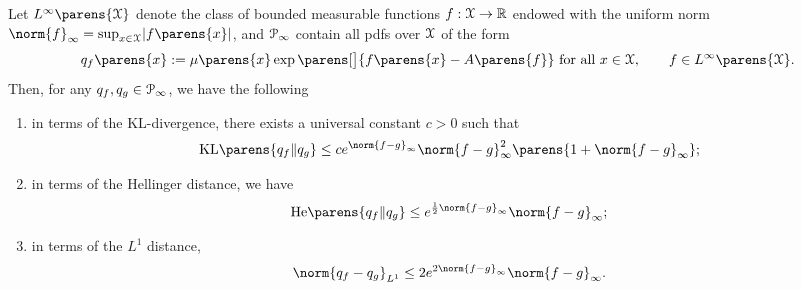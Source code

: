 \begin{lemma}\label{lemma-relationship-density-distances}
	Let $L^{\infty} \parens{\calX}$ denote the class of bounded measurable functions $f: \mathcal{X} \to \mathbb{R}$ endowed with the uniform norm $\norm{f}_{\infty} = \sup_{x \in \calX} \abs{f \parens{x}}$, and $\mathcal{P}_{\infty}$ contain all pdfs over $\mathcal{X}$ of the form 
	\begin{align*}
		q_f \parens{x} := \mu \parens{x} \exp \parens[\big]{f \parens{x} - A \parens{f}} \text{ for all } x \in \calX, \qquad f \in L^{\infty} \parens{\calX}. 
	\end{align*}
	Then, for any $q_f, q_g \in \mathcal{P}_{\infty}$, we have the following 
	\begin{enumerate}[label=(\alph*)]
		\item \label{lemma-relationship-density-distances-a} in terms of the KL-divergence, there exists a universal constant $c > 0$ such that 
		\begin{align*}
			\KLdiv \parens{q_f \Vert q_g} \le c e^{\norm{f - g}_{\infty}} \norm{f - g}_{\infty}^2 \parens{1 + \norm{f - g}_{\infty}}; 
		\end{align*}
		\item \label{lemma-relationship-density-distances-b} in terms of the Hellinger distance, we have 
		\begin{align*}
			\mathrm{He} \parens{q_f \Vert q_g} \le e^{\frac{1}{2} \norm{f - g}_{\infty}} \norm{f - g}_{\infty}; 
		\end{align*}
		\item \label{lemma-relationship-density-distances-c} in terms of the $L^1$ distance, 
		\begin{align*}
			\norm{q_f - q_g}_{L^1} \le 2e^{2 \norm{f - g}_{\infty}} \norm{f - g}_{\infty}. 
		\end{align*}
	\end{enumerate}
\end{lemma}


